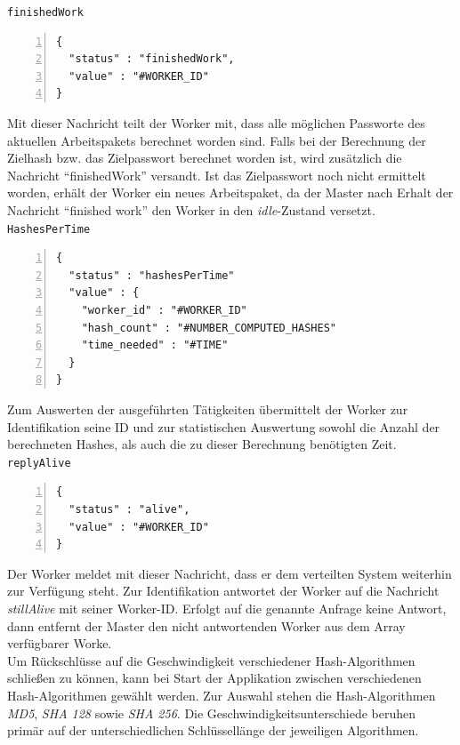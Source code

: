 \texttt{finishedWork}
\begin{lstlisting}[basicstyle=\ttfamily,numbers=left,numberstyle=\footnotesize\ttfamily,backgroundcolor=\color{sourcegray}]
{
  "status" : "finishedWork",
  "value" : "#WORKER_ID"
}
\end{lstlisting}
Mit dieser Nachricht teilt der Worker mit, dass alle möglichen Passworte des aktuellen Arbeitspakets berechnet worden sind. Falls bei der Berechnung der Zielhash bzw. das Zielpasswort berechnet worden ist, wird zusätzlich die Nachricht \enquote{finishedWork} versandt. Ist das Zielpasswort noch nicht ermittelt worden, erhält der Worker ein neues Arbeitspaket, da der Master nach Erhalt der Nachricht \enquote{finished work} den Worker in den \emph{idle}-Zustand versetzt. \\

\texttt{HashesPerTime}
\begin{lstlisting}[basicstyle=\ttfamily,numbers=left,numberstyle=\footnotesize\ttfamily,backgroundcolor=\color{sourcegray}]
{
  "status" : "hashesPerTime"
  "value" : {
    "worker_id" : "#WORKER_ID"
    "hash_count" : "#NUMBER_COMPUTED_HASHES"
    "time_needed" : "#TIME"
  }
}
\end{lstlisting}
Zum Auswerten der ausgeführten Tätigkeiten übermittelt der Worker zur Identifikation seine ID und zur statistischen Auswertung sowohl die Anzahl der berechneten Hashes, als auch die zu dieser Berechnung benötigten Zeit. \\

\texttt{replyAlive}
\begin{lstlisting}[basicstyle=\ttfamily,numbers=left,numberstyle=\footnotesize\ttfamily,backgroundcolor=\color{sourcegray}]
{
  "status" : "alive",
  "value" : "#WORKER_ID"
}
\end{lstlisting}
Der Worker meldet mit dieser Nachricht, dass er dem verteilten System weiterhin zur Verfügung steht. Zur Identifikation antwortet der Worker auf die Nachricht 
\emph{stillAlive} mit seiner Worker-ID. Erfolgt auf die genannte Anfrage keine Antwort, dann entfernt der Master den nicht antwortenden Worker aus dem Array verfügbarer Worke.\\

Um Rückschlüsse auf die Geschwindigkeit verschiedener Hash-Algorithmen schließen zu können, kann bei Start der Applikation zwischen verschiedenen Hash-Algorithmen gewählt werden. Zur Auswahl stehen die Hash-Algorithmen \emph{MD5}, \emph{SHA 128} sowie \emph{SHA 256}. Die Geschwindigkeitsunterschiede beruhen primär auf der unterschiedlichen Schlüssellänge der jeweiligen Algorithmen.


